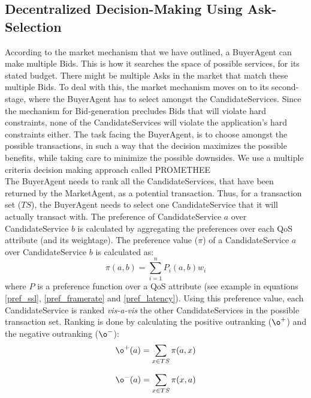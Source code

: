 \documentclass[10pt,journal,compsoc]{IEEEtran}
\begin{document}
\subsection{Decentralized Decision-Making Using Ask-Selection}\label{ask_selection}
According to the market mechanism that we have outlined, a BuyerAgent can make multiple Bids. This is how it searches the space of possible services, for its stated budget. There might be multiple Asks in the market that match these multiple Bids. To deal with this, the market mechanism moves on to its second-stage, where the BuyerAgent has to select amongst the CandidateServices. Since the mechanism for Bid-generation precludes Bids that will violate hard constraints, none of the CandidateServices will violate the application's hard constraints either. The task facing the BuyerAgent, is to choose amongst the possible transactions, in such a way that the decision maximizes the possible benefits, while taking care to minimize the possible downsides. We use a multiple criteria decision making approach called PROMETHEE~\cite{Brans1985Preference}\\
The BuyerAgent needs to rank all the CandidateServices, that have been returned by the MarketAgent, as a potential transaction. Thus, for a transaction set ($TS$), the BuyerAgent needs to select one CandidateService that it will actually transact with. The preference of CandidateService $a$ over CandidateService $b$ is calculated by aggregating the preferences over each QoS attribute (and its weightage). The preference value ($\pi$) of a CandidateService $a$ over CandidateService $b$ is calculated as:
\begin{equation}
\pi(a,b) = \sum_{i=1}^{n} P_{i}(a,b)w_{i}
\end{equation}
where $P$ is a preference function over a QoS attribute (see example in equations \ref{pref_ssl}, \ref{pref_framerate} and \ref{pref_latency}). Using this preference value, each CandidateService is ranked \textit{vis-a-vis} the other CandidateServices in the possible transaction set. Ranking is done by calculating the positive outranking ($\o^{+}$) and the negative outranking ($\o^{-}$):
\begin{equation}
\o^{+}(a) = \sum_{x \in TS}\pi(a,x)
\label{positive_outranking}
\end{equation}

\begin{equation}
\o^{-}(a) = \sum_{x \in TS}\pi(x,a)
\label{negative_outranking}
\end{equation}
\end{document}

